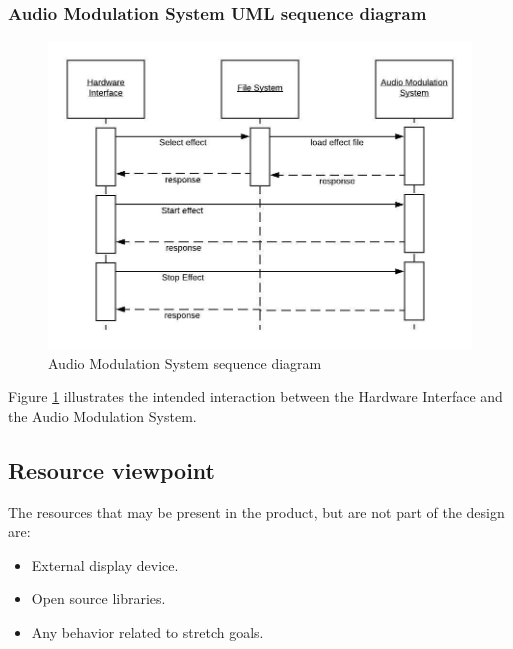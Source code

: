     \subsubsection{Audio Modulation System UML sequence diagram}
        \begin{figure}[!ht]
            \centering
            \includegraphics[width=.75\textwidth]{diagrams/modulation-interaction.jpeg}
            \caption{Audio Modulation System sequence diagram}
            \label{fig:modulation}
        \end{figure}
        Figure \ref{fig:modulation} illustrates the intended interaction between the Hardware Interface and the Audio Modulation System.
        


\subsection{Resource viewpoint}
    The resources that may be present in the product, but are not part of the design are:
    \begin{itemize}
        \item External display device.
        \item Open source libraries.
        \item Any behavior related to stretch goals.
    \end{itemize}